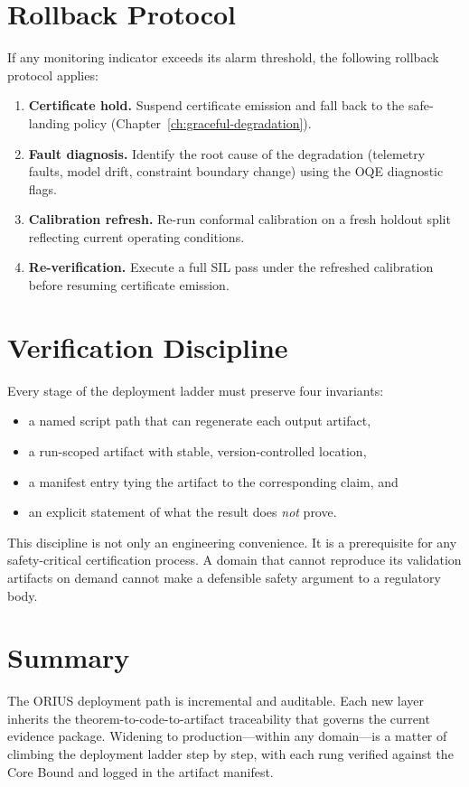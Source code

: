 \section{Rollback Protocol}

If any monitoring indicator exceeds its alarm threshold, the following
rollback protocol applies:

\begin{enumerate}
  \item \textbf{Certificate hold.}  Suspend certificate emission and fall
    back to the safe-landing policy (Chapter~\ref{ch:graceful-degradation}).
  \item \textbf{Fault diagnosis.}  Identify the root cause of the degradation
    (telemetry faults, model drift, constraint boundary change) using the
    OQE diagnostic flags.
  \item \textbf{Calibration refresh.}  Re-run conformal calibration on a
    fresh holdout split reflecting current operating conditions.
  \item \textbf{Re-verification.}  Execute a full SIL pass under the refreshed
    calibration before resuming certificate emission.
\end{enumerate}

\section{Verification Discipline}

Every stage of the deployment ladder must preserve four invariants:

\begin{itemize}
  \item a named script path that can regenerate each output artifact,
  \item a run-scoped artifact with stable, version-controlled location,
  \item a manifest entry tying the artifact to the corresponding claim, and
  \item an explicit statement of what the result does \emph{not} prove.
\end{itemize}

This discipline is not only an engineering convenience.  It is a
prerequisite for any safety-critical certification process.  A domain
that cannot reproduce its validation artifacts on demand cannot make a
defensible safety argument to a regulatory body.

\section{Summary}

The ORIUS deployment path is incremental and auditable.  Each new layer
inherits the theorem-to-code-to-artifact traceability that governs the
current evidence package.  Widening to production---within any domain---is
a matter of climbing the deployment ladder step by step, with each rung
verified against the Core Bound and logged in the artifact manifest.
